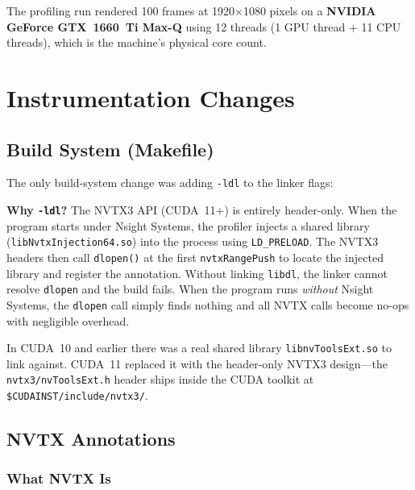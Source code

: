 \documentclass[
	english,
	letterpaper, oneside
]{article}
\begin{document}
The profiling run rendered 100 frames at 1920$\times$1080 pixels on a
\textbf{NVIDIA GeForce GTX~1660~Ti Max-Q} using 12 threads (1 GPU thread +
11 CPU threads), which is the machine's physical core count.

\section{Instrumentation Changes}

\subsection{Build System (Makefile)}

The only build-system change was adding \texttt{-ldl} to the linker flags:


\textbf{Why \texttt{-ldl}?} The NVTX3 API (CUDA~11+) is entirely
header-only. When the program starts under Nsight Systems, the profiler
injects a shared library (\texttt{libNvtxInjection64.so}) into the process
using \texttt{LD\_PRELOAD}. The NVTX3 headers then call \texttt{dlopen()}
at the first \texttt{nvtxRangePush} to locate the injected library and
register the annotation. Without linking \texttt{libdl}, the linker cannot
resolve \texttt{dlopen} and the build fails. When the program runs
\emph{without} Nsight Systems, the \texttt{dlopen} call simply finds
nothing and all NVTX calls become no-ops with negligible overhead.

In CUDA~10 and earlier there was a real shared library
\texttt{libnvToolsExt.so} to link against. CUDA~11 replaced it with the
header-only NVTX3 design—the \texttt{nvtx3/nvToolsExt.h} header ships
inside the CUDA toolkit at \texttt{\$CUDAINST/include/nvtx3/}.

\subsection{NVTX Annotations}

\subsubsection{What NVTX Is}
\end{document}
